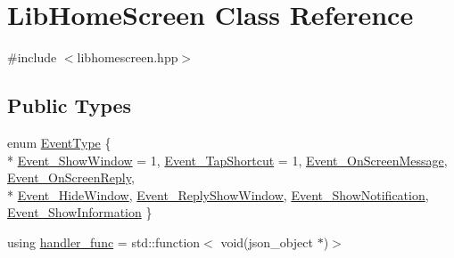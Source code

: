 \hypertarget{class_lib_home_screen}{}\section{Lib\+Home\+Screen Class Reference}
\label{class_lib_home_screen}


{\ttfamily \#include $<$libhomescreen.\+hpp$>$}

\subsection*{Public Types}
\begin{DoxyCompactItemize}
\item 
enum \hyperlink{class_lib_home_screen_a82616c91ac211d2ad08e709b524bf154}{Event\+Type} \{ \\*
\hyperlink{class_lib_home_screen_a82616c91ac211d2ad08e709b524bf154a3fb3563c64786f1a2ae404df6edffd5c}{Event\+\_\+\+Show\+Window} = 1, 
\hyperlink{class_lib_home_screen_a82616c91ac211d2ad08e709b524bf154a4b0a82d501e4db5fbfe25c254c92896f}{Event\+\_\+\+Tap\+Shortcut} = 1, 
\hyperlink{class_lib_home_screen_a82616c91ac211d2ad08e709b524bf154aea56fa32a124a8ddcbea127755280a1d}{Event\+\_\+\+On\+Screen\+Message}, 
\hyperlink{class_lib_home_screen_a82616c91ac211d2ad08e709b524bf154acae91db4efc2394fd701f581d277a3fd}{Event\+\_\+\+On\+Screen\+Reply}, 
\\*
\hyperlink{class_lib_home_screen_a82616c91ac211d2ad08e709b524bf154aef8bb1086ddbc0a125d77af9da3146a0}{Event\+\_\+\+Hide\+Window}, 
\hyperlink{class_lib_home_screen_a82616c91ac211d2ad08e709b524bf154aaacb8babce7fac884ab4bf7605da0d9f}{Event\+\_\+\+Reply\+Show\+Window}, 
\hyperlink{class_lib_home_screen_a82616c91ac211d2ad08e709b524bf154a68119a9c3ff85e807db38d3282e5ca30}{Event\+\_\+\+Show\+Notification}, 
\hyperlink{class_lib_home_screen_a82616c91ac211d2ad08e709b524bf154a1fad2ac5071a1dae7db9c8e1b522669b}{Event\+\_\+\+Show\+Information}
 \}
\item 
using \hyperlink{class_lib_home_screen_a334f11f81c84c98d18284215dcaada3a}{handler\+\_\+func} = std\+::function$<$ void(json\+\_\+object $\ast$)$>$
\end{DoxyCompactItemize}
